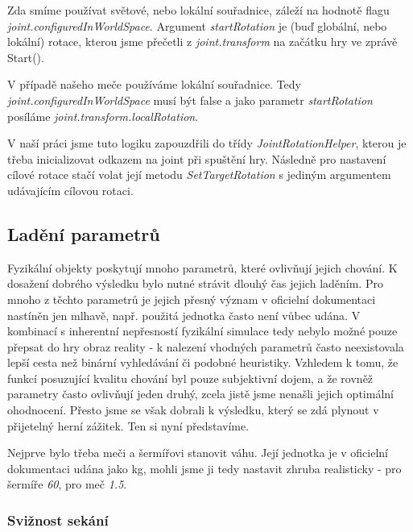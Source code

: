 Zda smíme používat světové, nebo lokální souřadnice, záleží na hodnotě flagu \textit{joint.configuredInWorldSpace}. Argument \textit{startRotation} je (buď globální, nebo lokální) rotace, kterou jsme přečetli z \textit{joint.transform} na začátku hry ve zprávě Start().

V případě našeho meče používáme lokální souřadnice. Tedy \textit{joint.configuredInWorldSpace} musí být false a jako parametr \textit{startRotation} posíláme \textit{joint.transform.localRotation}.

V naší práci jsme tuto logiku zapouzdřili do třídy \textit{JointRotationHelper}, kterou je třeba inicializovat odkazem na joint při spuštění hry. Následně pro nastavení cílové rotace stačí volat její metodu \textit{SetTargetRotation} s jediným argumentem udávajícím cílovou rotaci.


\subsection{Ladění parametrů} \label{swordParameterTweaksSection}

Fyzikální objekty poskytují mnoho parametrů, které ovlivňují jejich chování. K dosažení dobrého výsledku bylo nutné strávit dlouhý čas jejich laděním. Pro mnoho z těchto parametrů je jejich přesný význam v oficielní dokumentaci nastíněn jen mlhavě, např. použitá jednotka často není vůbec udána. V kombinací s inherentní nepřesností fyzikální simulace tedy nebylo možné pouze přepsat do hry obraz reality - k nalezení vhodných parametrů často neexistovala lepší cesta než binární vyhledávání či podobné heuristiky. Vzhledem k tomu, že funkcí posuzující kvalitu chování byl pouze subjektivní dojem, a že rovněž parametry často ovlivňují jeden druhý, zcela jistě jsme nenašli jejich optimální ohodnocení. Přesto jsme se však dobrali k výsledku, který se zdá plynout v přijetelný herní zážitek. Ten si nyní představíme.

\bigbreak
Nejprve bylo třeba meči a šermířovi stanovit váhu. Její jednotka je v oficielní dokumentaci udána jako kg, mohli jsme ji tedy nastavit zhruba realisticky - pro šermíře \textit{60}, pro meč \textit{1.5}.

\subsubsection*{Svižnost sekání}

